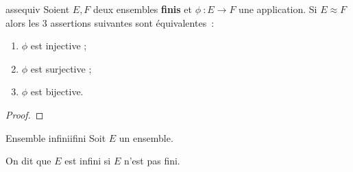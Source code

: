 \documentclass[a4paper,french,final]{memoir}
\begin{document}
\begin{theoremb}{}{assequiv}
	Soient $E, F$ deux ensembles \textbf{finis} et $\phi~: E \to F$ une application. Si $E \mathrel{\approx} F$ alors les 3 assertions suivantes sont équivalentes~:

	\begin{enumerate}
		\item $\phi$ est injective ;
		\item $\phi$ est surjective ;
		\item $\phi$ est bijective.
	\end{enumerate}
  \end{theoremb}

\begin{proof}
\textellipsis
\end{proof}
\begin{defb}{Ensemble infini}{ifini}
	Soit $E$ un ensemble.

	On dit que $E$ est infini si $E$ n'est pas fini.
\end{defb}
\end{document}
